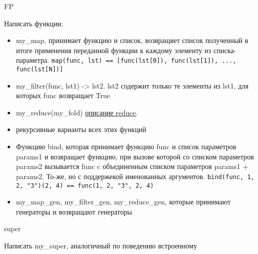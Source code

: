 \documentclass{article}
\begin{document}
\begin{center} FP \end{center}
Написать функции:
\begin{itemize}
    \item my\_map, принимает функцию и список, 
            возвращяет список полученный в итоге применения переданной функции 
            к каждому элементу из списка-параметра. 
            \lstinline!map(func, lst) == [func(lst[0]), func(lst[1]), ..., func(lst[N])]!
    \item my\_filter(func, lst1) -> lst2. lst2 содержит только те элементы из lst1,
          для которых func возвращает True
    \item my\_reduce(my\_fold) 
\href{http://ru.wikipedia.org/wiki/%D0%A1%D0%B2%D1%91%D1%80%D1%82%D0%BA%D0%B0_%D1%81%D0%BF%D0%B8%D1%81%D0%BA%D0%B0}{описание reduce}.
    \item рекурсивные варианты всех этих функций
    \item Функцию bind, которая принимает функцию func и список параметров params1
          и возвращает функцию, при вызове которой со списком параметров params2 вызывается
          func c объединенным списком параметров params1 + params2.
          То-же, но с поддержекой именованных аргументов.
          \lstinline!bind(func, 1, 2, "3")(2, 4) == func(1, 2, "3", 2, 4)!
    \item my\_map\_gen, my\_filter\_gen, my\_reduce\_gen, которые принимают генераторы и возвращают генераторы
\end{itemize}
\newpage

\begin{center} super \end{center}
Написать my\_super, аналогичный по поведению встроенному 
\newpage
\end{document}
